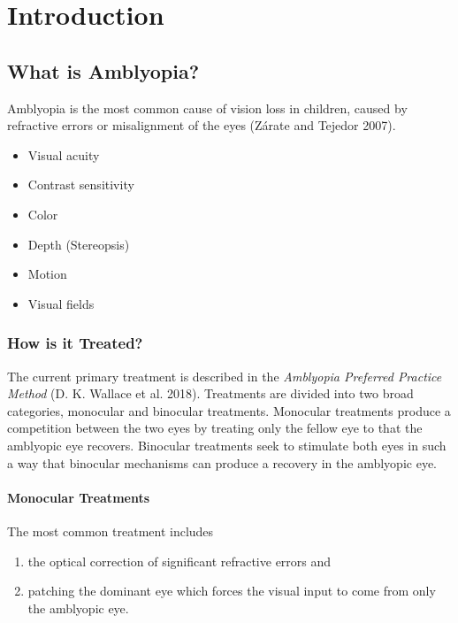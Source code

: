\documentclass[
  letterpaper,
  DIV=11,
  numbers=noendperiod]{scrreprt}
\providecommand{\tightlist}{%
  \setlength{\itemsep}{0pt}\setlength{\parskip}{0pt}}\usepackage{longtable,booktabs,array}
\begin{document}
\part{Introduction}

\hypertarget{what-is-amblyopia}{%
\chapter{What is Amblyopia?}\label{what-is-amblyopia}}

Amblyopia is the most common cause of vision loss in children, caused by
refractive errors or misalignment of the eyes (Zárate and Tejedor 2007).

\begin{itemize}
\tightlist
\item
  Visual acuity
\item
  Contrast sensitivity
\item
  Color
\item
  Depth (Stereopsis)
\item
  Motion
\item
  Visual fields
\end{itemize}

\hypertarget{how-is-it-treated}{%
\section{How is it Treated?}\label{how-is-it-treated}}

The current primary treatment is described in the \emph{Amblyopia
Preferred Practice Method} (D. K. Wallace et al. 2018). Treatments are
divided into two broad categories, monocular and binocular treatments.
Monocular treatments produce a competition between the two eyes by
treating only the fellow eye to that the amblyopic eye recovers.
Binocular treatments seek to stimulate both eyes in such a way that
binocular mechanisms can produce a recovery in the amblyopic eye.

\hypertarget{monocular-treatments}{%
\subsection{Monocular Treatments}\label{monocular-treatments}}

The most common treatment includes

\begin{enumerate}
\def\labelenumi{\arabic{enumi}.}
\tightlist
\item
  the optical correction of significant refractive errors and
\item
  patching the dominant eye which forces the visual input to come from
  only the amblyopic eye.
\end{enumerate}
\end{document}
